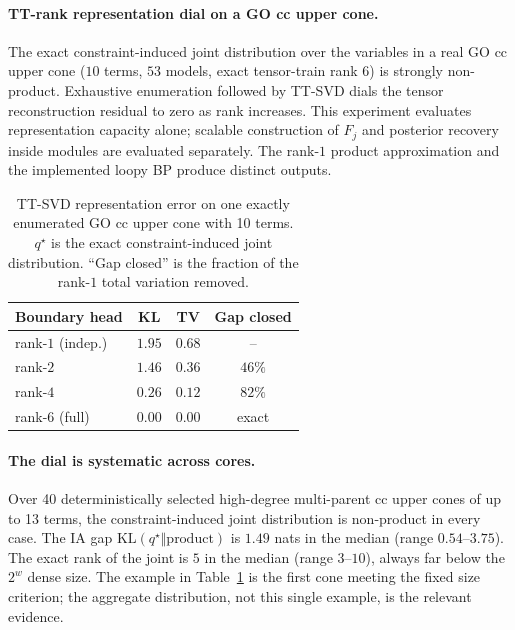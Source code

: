 \documentclass[letterpaper]{article}
\begin{document}
\paragraph{TT-rank representation dial on a GO cc upper cone.}
The exact constraint-induced joint distribution over the variables in a real GO cc upper cone ($10$ terms, $53$ models, exact tensor-train rank $6$) is strongly non-product. Exhaustive enumeration followed by TT-SVD dials the tensor reconstruction residual to zero as rank increases. This experiment evaluates representation capacity alone; scalable construction of \(F_j\) and posterior recovery inside modules are evaluated separately. The rank-$1$ product approximation and the implemented loopy BP produce distinct outputs.

\begin{table}[t]\centering
\caption{TT-SVD representation error on one exactly enumerated GO cc upper cone with 10 terms. $q^\star$ is the exact constraint-induced joint distribution. ``Gap closed'' is the fraction of the rank-$1$ total variation removed.}\label{tab:rank}
\footnotesize
\setlength{\tabcolsep}{3pt}
\begin{tabular}{@{}lccc@{}}
\toprule
Boundary head & KL & TV & Gap closed\\
\midrule
rank-$1$ (indep.) & $1.95$ & $0.68$ & -- \\
rank-$2$ & $1.46$ & $0.36$ & $46\%$\\
rank-$4$ & $0.26$ & $0.12$ & $82\%$\\
rank-$6$ (full) & $0.00$ & $0.00$ & exact\\
\bottomrule
\end{tabular}
\end{table}

\paragraph{The dial is systematic across cores.}
Over 40 deterministically selected high-degree multi-parent cc upper cones of up to 13 terms, the
constraint-induced joint distribution is non-product in every case. The IA gap
$\mathrm{KL}(q^\star\Vert\text{product})$ is $1.49$ nats in the median (range $0.54$--$3.75$).
The exact rank of the joint is $5$ in the median (range $3$--$10$), always far below the $2^{w}$
dense size. The example in Table~\ref{tab:rank} is the first cone meeting the fixed size criterion;
the aggregate distribution, not this single example, is the relevant evidence.
\end{document}
